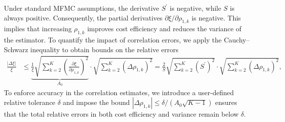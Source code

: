 Under standard MFMC assumptions, the derivative $S^\prime$ is negative, while $S$ is always positive. Consequently, the partial derivatives $\partial \xi / \partial \rho_{1,k}$ is negative. This implies that increasing $\rho_{1,k}$ improves cost efficiency and reduces the variance of the estimator. To quantify the impact of correlation errors, we apply the Cauchy–Schwarz inequality to obtain bounds on the relative errors
%
\begin{align}
\label{eq:delta_xi_bound}
    \frac{\left|\Delta \xi\right|}{\xi}&\le \underbrace{\frac{1}{\xi}\sqrt{\sum_{k=2}^K \left(\frac{\partial \xi}{\partial \rho_{1,k}}\right)^2}}_{A_0} \cdot \sqrt{\sum_{k=2}^K\left(\Delta\rho_{1,k}\right)^2}=\frac{2}{S}\sqrt{\sum_{k=2}^K(S^\prime)^2} \cdot \sqrt{\sum_{k=2}^K\left(\Delta\rho_{1,k}\right)^2},
\end{align}
%
To enforce accuracy in the correlation estimates, we introduce a user-defined relative tolerance $\delta$ and impose the bound $|\Delta \rho_{1,k}| \le \delta / (A_0 \sqrt{K - 1})$ ensures that the total relative errors in both cost efficiency and variance remain below $\delta$.









